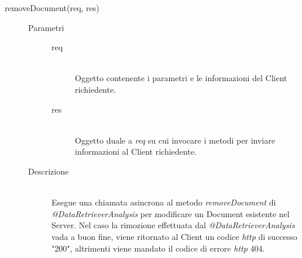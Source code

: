 \begin{description}
\begin{description}
 \item[removeDocument(req, res)] \hfill 
 \begin{description}
 \item[Parametri] \hfill
  \begin{description}
   \item[req] \hfill \\
   Oggetto contenente i parametri e le informazioni del Client richiedente.
   \item[res] \hfill \\
   Oggetto duale a \textit{req} su cui invocare i metodi per inviare informazioni al Client richiedente.
  \end{description}
 \item[Descrizione] \hfill \\
 Esegue una chiamata asincrona al metodo \textit{removeDocument} di \textit{@DataRetrieverAnalysis} per modificare un Document esistente nel Server. Nel caso la rimozione effettuata dal \textit{@DataRetrieverAnalysis} vada a buon fine, viene ritornato al Client un codice \textit{http} di successo "200", altrimenti viene mandato il codice di errore \textit{http} 404.
 \end{description}
 
 \end{description}
 
\end{description} %


